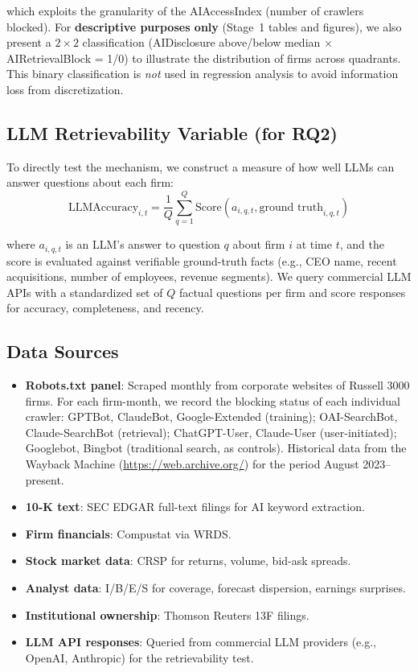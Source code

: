 \documentclass[12pt,a4paper]{article}
\begin{document}
\noindent which exploits the granularity of the AIAccessIndex (number of crawlers blocked). For \textbf{descriptive purposes only} (Stage~1 tables and figures), we also present a $2 \times 2$ classification (AIDisclosure above/below median $\times$ AIRetrievalBlock = 1/0) to illustrate the distribution of firms across quadrants. This binary classification is \emph{not} used in regression analysis to avoid information loss from discretization.

\subsection{LLM Retrievability Variable (for RQ2)}

To directly test the mechanism, we construct a measure of how well LLMs can answer questions about each firm:
\begin{equation}
\text{LLMAccuracy}_{i,t} = \frac{1}{Q}\sum_{q=1}^{Q} \text{Score}(a_{i,q,t}, \text{ground truth}_{i,q,t})
\end{equation}

\noindent where $a_{i,q,t}$ is an LLM's answer to question $q$ about firm $i$ at time $t$, and the score is evaluated against verifiable ground-truth facts (e.g., CEO name, recent acquisitions, number of employees, revenue segments). We query commercial LLM APIs with a standardized set of $Q$ factual questions per firm and score responses for accuracy, completeness, and recency.

\subsection{Data Sources}

\begin{itemize}
    \item \textbf{Robots.txt panel}: Scraped monthly from corporate websites of Russell 3000 firms. For each firm-month, we record the blocking status of each individual crawler: GPTBot, ClaudeBot, Google-Extended (training); OAI-SearchBot, Claude-SearchBot (retrieval); ChatGPT-User, Claude-User (user-initiated); Googlebot, Bingbot (traditional search, as controls). Historical data from the Wayback Machine (\url{https://web.archive.org/}) for the period August 2023--present.
    \item \textbf{10-K text}: SEC EDGAR full-text filings for AI keyword extraction.
    \item \textbf{Firm financials}: Compustat via WRDS.
    \item \textbf{Stock market data}: CRSP for returns, volume, bid-ask spreads.
    \item \textbf{Analyst data}: I/B/E/S for coverage, forecast dispersion, earnings surprises.
    \item \textbf{Institutional ownership}: Thomson Reuters 13F filings.
    \item \textbf{LLM API responses}: Queried from commercial LLM providers (e.g., OpenAI, Anthropic) for the retrievability test.
\end{itemize}
\end{document}
